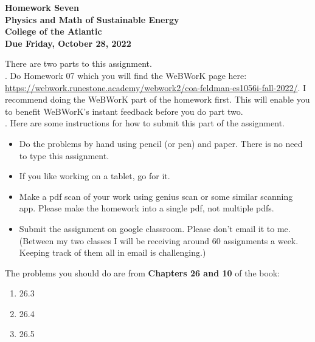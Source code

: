 \documentclass[12pt]{article}
\begin{document}
\pagestyle{empty}
 
\begin{center}
{\LARGE {\bf Homework Seven}}\\
\bigskip
{\Large {\bf Physics and Math of Sustainable Energy}}\\
\bigskip
{\Large {\bf College of the Atlantic}}\\
\bigskip
{ {\bf Due Friday, October 28, 2022}}\\ 
\end{center}
\medskip


\noindent There are two parts to this assignment.\\

.  Do Homework 07 which you
will find the WeBWorK page here:
\url{https://webwork.runestone.academy/webwork2/coa-feldman-es1056i-fall-2022/}.
I recommend doing the WeBWorK part of the homework first.  This will
enable you to benefit WeBWorK's instant feedback before you do part
two.\\ 


.  Here are some
instructions for how to submit this part of the assignment.
\begin{itemize}
\item Do the problems by hand using pencil (or pen) and paper.
  There is no need to type this assignment.
\item If you like working on a tablet, go for it. 
\item Make a pdf scan of your work using genius scan or some
  similar scanning app.  Please make the homework into a single
  pdf, not multiple pdfs.
\item Submit the assignment on google classroom.  Please don't
  email it to me.  (Between my two classes I will be receiving
  around 60 assignments a week.  Keeping track of them all in email 
  is challenging.)\\
\end{itemize}

\noindent The problems you should do are from {\bf Chapters 26 and
  10} of the book:  \\

\begin{enumerate}
\setlength{\itemsep}{-1mm}
\item 26.3
\item 26.4
\item 26.5
\end{enumerate}
\end{document}

